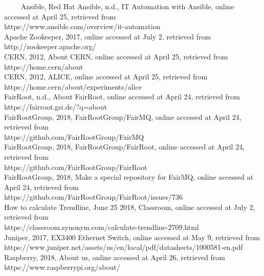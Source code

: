 ~~~~ Ansible, Red Hat Ansible, n.d., IT Automation with Ansible, online accessed at April 25, retrieved from \\https://www.ansible.com/overview/it-automation\\

Apache Zookeeper, 2017, online accessed at July 2, retrieved from \\http://zookeeper.apache.org/\\

CERN, 2012, About CERN, online accessed at April 25, retrieved from \\https://home.cern/about\\

CERN, 2012, ALICE, online accessed at April 25, retrieved from \\https://home.cern/about/experiments/alice\\

FairRoot, n.d., About FairRoot, online accessed at April 24, retrieved from \\https://fairroot.gsi.de/?q=about\\

FairRootGroup, 2018, FairRootGroup/FairMQ, online accessed at April 24, retrieved from
\\https://github.com/FairRootGroup/FairMQ\\

FairRootGroup, 2018, FairRootGroup/FairRoot, online accessed at April 24, retrieved from \\https://github.com/FairRootGroup/FairRoot\\

FairRootGroup, 2018, Make a special repository for FairMQ, online accessed at April 24, retrieved from
\\https://github.com/FairRootGroup/FairRoot/issues/736\\

How to calculate Trendline, June 25 2018, Classroom, online accessed at July 2, retrieved from \\https://classroom.synonym.com/calculate-trendline-2709.html\\

Juniper, 2017, EX3400 Ethernet Switch, online accessed at May 9, retrieved from \\https://www.juniper.net/assets/us/en/local/pdf/datasheets/1000581-en.pdf\\

Raspberry, 2018, About us, online accessed at April 26, retrieved from
\\https://www.raspberrypi.org/about/\\


